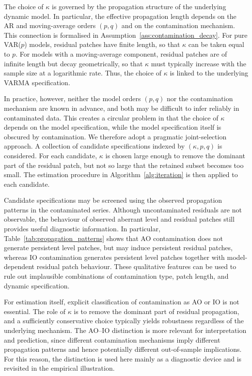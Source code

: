 \documentclass[12pt]{article}
\numberwithin{equation}{section}
\begin{document}
The choice of $\kappa$ is governed by the propagation structure of the underlying dynamic model. 
In particular, the effective propagation length depends on the AR and moving-average orders $(p,q)$ and on the contamination mechanism. 
This connection is formalised in Assumption~\ref{ass:contamination_decay}. 
For pure VAR($p$) models, residual patches have finite length, so that $\kappa$ can be taken equal to $p$. 
For models with a moving-average component, residual patches are of infinite length but decay geometrically, so that $\kappa$ must typically increase with the sample size at a logarithmic rate. 
Thus, the choice of $\kappa$ is linked to the underlying VARMA specification.

In practice, however, neither the model orders $(p,q)$ nor the contamination mechanism are known in advance, and both may be difficult to infer reliably in contaminated data. 
This creates a circular problem in that the choice of $\kappa$ depends on the model specification, while the model specification itself is obscured by contamination.
We therefore adopt a pragmatic joint-selection approach. 
A collection of candidate specifications indexed by $(\kappa,p,q)$ is considered. 
For each candidate, $\kappa$ is chosen large enough to remove the dominant part of the residual patch, but not so large that the retained subset becomes too small. 
The estimation procedure in Algorithm~\ref{alg:iteration} is then applied to each candidate.

Candidate specifications may be screened using the observed propagation patterns in the contaminated series. 
Although uncontaminated residuals are not observable, the behaviour of observed aberrant level and residual patches still provides useful diagnostic information. 
In particular, Table~\ref{tab:propagation_patterns} shows that AO contamination does not generate persistent level patches, but may induce persistent residual patches, whereas IO contamination generates persistent level patches together with model-dependent residual patch behaviour. 
These qualitative features can be used to rule out implausible combinations of contamination type, patch length, and dynamic specification.

For estimation itself, explicit classification of contamination as AO or IO is not essential. 
The role of $\kappa$ is to remove the dominant part of residual propagation, and a sufficiently conservative choice typically yields robustness regardless of the underlying mechanism. 
The AO--IO distinction is more relevant for interpretation and prediction, since different contamination mechanisms imply different propagation patterns and hence potentially different out-of-sample implications. 
For this reason, the distinction is used here mainly as a diagnostic device and is revisited in the empirical illustration.
\end{document}
